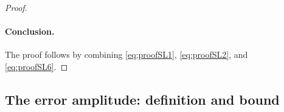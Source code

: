 \documentclass[11pt,a4paper]{article}
\numberwithin{equation}{section}
\theoremstyle{plain}
\theoremstyle{definition}
\newcommand{\connect}{\xleftrightarrow}
\begin{document}
\begin{proof}
\paragraph{Conclusion.} The proof follows by combining \eqref{eq:proofSL1}, \eqref{eq:proofSL2}, and \eqref{eq:proofSL6}.	
\end{proof}
%





\subsection{The error amplitude: definition and bound}
\end{document}
